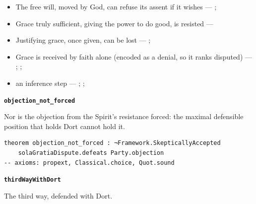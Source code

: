 \documentclass[11pt]{article}
\begin{document}
\begin{itemize}
\begin{itemize}
\item The free will, moved by God, can refuse its assent if it wishes --- \cite[Trent, Session VI (1547), canon 4]{tanner-decrees-1990}; \cite[45]{waterworth-trent-1848}
\item Grace truly sufficient, giving the power to do good, is resisted --- \cite[ch. VI]{garrigou-lagrange-grace-1952}
\item Justifying grace, once given, can be lost --- \cite[II-II q.24 a.11]{aquinas-summa-1920}; \cite[Trent, Session VI (1547), canon 23]{tanner-decrees-1990}
\item Grace is received by faith alone (encoded as a denial, so it ranks disputed) --- \cite[II-II q.4 a.3]{aquinas-summa-1920}; \cite[I-II q.113 a.4 ad 1]{aquinas-summa-1920}; \cite[Trent, Session VI (1547), canon 9]{tanner-decrees-1990}
\item an inference step --- \cite{pohle-molinism-1911}; \cite[I-II q.112 a.3]{aquinas-summa-1920}; \cite[ch. VII]{garrigou-lagrange-grace-1952}
\end{itemize}
\end{itemize}
\par\medskip\noindent\textbf{\texttt{objection\_\allowbreak{}not\_\allowbreak{}forced}}\par\nobreak\noindent
Nor is the objection from the Spirit’s resistance forced: the maximal defensible position that holds Dort cannot hold it.

{\small\begin{verbatim}
theorem objection_not_forced : ¬Framework.SkepticallyAccepted
    solaGratiaDispute.defeats Party.objection
-- axioms: propext, Classical.choice, Quot.sound
\end{verbatim}}
\par\medskip\noindent\textbf{\texttt{third\allowbreak{}Way\allowbreak{}With\allowbreak{}Dort}}\par\nobreak\noindent
The third way, defended with Dort.
\end{document}

